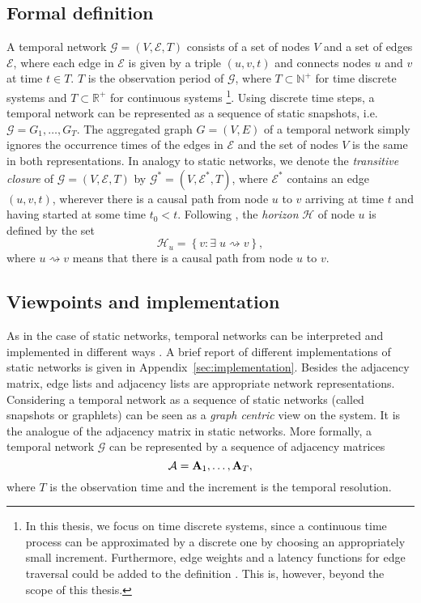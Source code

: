 \subsection{Formal definition}
A temporal network $\mathcal{G}=(V,\mathcal{E},T)$ consists of a set of nodes $V$ and a set of edges $\mathcal{E}$, where each edge in $\mathcal{E}$ is given by a triple $(u,v,t)$ and connects nodes $u$ and $v$ at time $t\in T$.
$T$ is the observation period of $\mathcal{G}$, where $T\subset \mathbb{N}^+$ for time discrete systems and $T\subset \mathbb{R}^+$ for continuous systems%
\footnote{%
In this thesis, we focus on time discrete systems, since a continuous time process can be approximated by a discrete one by choosing an appropriately small increment.
Furthermore, edge weights and a latency functions for edge traversal could be added to the definition \citep{Casteights_review}.
This is, however, beyond the scope of this thesis.
}.
Using discrete time steps, a temporal network can be represented as a sequence of static snapshots, i.e. $\mathcal{G}=G_1,\dots ,G_T$.
The aggregated graph $G=(V,E)$ of a temporal network simply ignores the occurrence times of the edges in $\mathcal{E}$ and the set of nodes $V$ is the same in both representations.
%
In analogy to static networks, we denote the \emph{transitive closure} of $\mathcal{G}=(V,\mathcal{E},T)$ by $\mathcal{G}^*=(V,\mathcal{E}^*,T)$, where $\mathcal{E}^*$ contains an edge $(u,v,t)$, wherever there is a causal path from node $u$ to $v$ arriving at time $t$ and having started at some time $t_0<t$.
%
Following \citep{Casteights_review}, the \emph{horizon} $\mathcal{H}$ of node $u$ is defined by the set
\begin{equation}\label{eq:temporal_horizon}
\mathcal{H}_u = \left\{ v: \exists \; u\rightsquigarrow v  \right\},
\end{equation}
where $ u\rightsquigarrow v $ means that there is a causal path from node $u$ to $v$.

\subsection{Viewpoints and implementation}\label{sec:tvg_viewpoints}
As in the case of static networks, temporal networks can be interpreted and implemented in different ways \citep{Casteights_review}.
A brief report of different implementations of static networks is given in Appendix~\ref{sec:implementation}.
Besides the adjacency matrix, edge lists and adjacency lists are appropriate network representations.
Considering a temporal network as a sequence of static networks (called snapshots or graphlets) can be seen as a \emph{graph centric} view on the system.
It is the analogue of the adjacency matrix in static networks.
More formally, a temporal network $\mathcal{G}$ can be represented by a sequence of adjacency matrices
\begin{equation}\label{eq:AdMatrixSequence}
\mathcal{A}=\mathbf{A}_1,\dots ,\mathbf{A}_T,
\end{equation}
where $T$ is the observation time and the increment is the temporal resolution.

